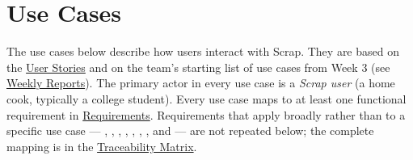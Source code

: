 \chapter{Use Cases}

\noindent The use cases below describe how users interact with Scrap. They are based on the \hyperref[Chapter:UserStories]{User Stories} and on the team's starting list of use cases from Week 3 (see \hyperref[Chapter:WeeklyReports]{Weekly Reports}). The primary actor in every use case is a \textit{Scrap user} (a home cook, typically a college student). Every use case maps to at least one functional requirement in \hyperref[Chapter:Requirements]{Requirements}. Requirements that apply broadly rather than to a specific use case --- , , , , , , , and  --- are not repeated below; the complete mapping is in the \hyperref[Chapter:Traceability]{Traceability Matrix}.

